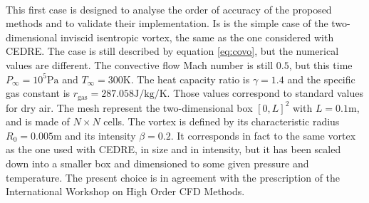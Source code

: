       \paragraph{}
      This first case is designed to analyse the order of accuracy of the proposed methods and to validate their implementation.
      Is is the simple case of the two-dimensional inviscid isentropic vortex, the same as the one considered with CEDRE.
      The case is still described by equation \ref{eq:covo}, but the numerical values are different.
      The convective flow Mach number is still $0.5$, but this time $P_\infty = 10^5\si{\pascal}$ and $T_\infty = 300\si{\kelvin}$.
      The heat capacity ratio is $\gamma = 1.4$ and the specific gas constant is $r_\textrm{gas} = 287.058\si{\joule\per\kilo\gram\per\kelvin}$.
      Those values correspond to standard values for dry air.
      The mesh represent the two-dimensional box $\left[0, L\right]^2$ with $L = 0.1\si{\meter}$, and is made of $N \times N$ cells.
      The vortex is defined by its characteristic radius $R_0 = 0.005\si{\meter}$ and its intensity $\beta = 0.2$.
      It corresponds in fact to the same vortex as the one used with CEDRE, in size and in intensity, but it has been scaled down into a smaller box and dimensioned to some given pressure and temperature.
      The present choice is in agreement with the prescription of the International Workshop on High Order CFD Methods.

      \paragraph{}

